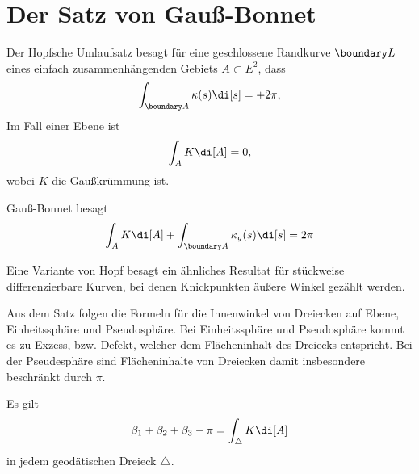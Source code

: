\section{Der Satz von Gauß-Bonnet}


Der Hopfsche Umlaufsatz besagt für eine geschlossene Randkurve $\boundary L$ eines einfach zusammenhängenden Gebiets $A \subset E^2$, dass
\[
	\int_{\boundary A} \kappa(s) \di[s] = + 2\pi,
\]
Im Fall einer Ebene ist
\[
	\int_A K \di[A] = 0,
\]
wobei $K$ die Gaußkrümmung ist.

Gauß-Bonnet besagt
\[
	\int_A K \di[A] + \int_{\boundary A} \kappa_g(s) \di[s] = 2 \pi
\]

Eine Variante von Hopf besagt ein ähnliches Resultat für stückweise differenzierbare Kurven, bei denen Knickpunkten äußere Winkel gezählt werden.

\begin{ex}
	Aus dem Satz folgen die Formeln für die Innenwinkel von Dreiecken auf Ebene, Einheitssphäre und Pseudosphäre.
	Bei Einheitssphäre und Pseudosphäre kommt es zu Exzess, bzw. Defekt, welcher dem Flächeninhalt des Dreiecks entspricht.
	Bei der Pseudesphäre sind Flächeninhalte von Dreiecken damit insbesondere beschränkt durch $\pi$.
\end{ex}

\begin{thm}
	Es gilt
	\[
		\beta_1 + \beta_2 + \beta_3 - \pi = \int_{\triangle} K \di[A]
	\]
	in jedem geodätischen Dreieck $\triangle$.
\end{thm}


